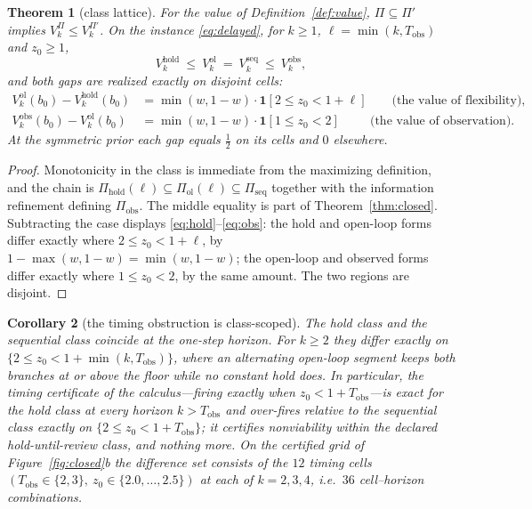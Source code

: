 \documentclass[11pt,a4paper]{article}
\theoremstyle{plain}
\newtheorem{theorem}{Theorem}[section]
\newtheorem{corollary}[theorem]{Corollary}
\theoremstyle{definition}
\theoremstyle{remark}
\newcommand{\hold}{\mathrm{hold}}
\newcommand{\ol}{\mathrm{ol}}
\newcommand{\seq}{\mathrm{seq}}
\newcommand{\obs}{\mathrm{obs}}
\newcommand{\Tobs}{T_{\mathrm{obs}}}
\newcommand{\ind}[1]{\mathbf{1}[#1]}
\newcommand{\tfr}[2]{\tfrac{#1}{#2}}
\begin{document}
\begin{theorem}[class lattice]\label{thm:lattice}
For the value of Definition~\ref{def:value}, $\Pi\subseteq\Pi'$ implies $V^{\Pi}_k\le V^{\Pi'}_k$. On the instance \eqref{eq:delayed}, for $k\ge1$, $\ell=\min(k,\Tobs)$ and $z_0\ge1$,
\[
V^{\hold}_k\ \le\ V^{\ol}_k\ =\ V^{\seq}_k\ \le\ V^{\obs}_k ,
\]
and both gaps are realized exactly on disjoint cells:
\begin{align}
V^{\ol}_k(b_0)-V^{\hold}_k(b_0)&=\min(w,1-w)\cdot\ind{2\le z_0<1+\ell}\qquad\text{(the value of flexibility)},\label{eq:flex}\\
V^{\obs}_k(b_0)-V^{\ol}_k(b_0)&=\min(w,1-w)\cdot\ind{1\le z_0<2}\qquad\ \ \text{(the value of observation)}.\label{eq:voi2}
\end{align}
At the symmetric prior each gap equals $\tfr12$ on its cells and $0$ elsewhere.
\end{theorem}

\begin{proof}
Monotonicity in the class is immediate from the maximizing definition, and the chain is $\Pi_{\hold}(\ell)\subseteq\Pi_{\ol}(\ell)\subseteq\Pi_{\seq}$ together with the information refinement defining $\Pi_{\obs}$. The middle equality is part of Theorem~\ref{thm:closed}. Subtracting the case displays \eqref{eq:hold}--\eqref{eq:obs}: the hold and open-loop forms differ exactly where $2\le z_0<1+\ell$, by $1-\max(w,1-w)=\min(w,1-w)$; the open-loop and observed forms differ exactly where $1\le z_0<2$, by the same amount. The two regions are disjoint.
\end{proof}

\begin{corollary}[the timing obstruction is class-scoped]\label{cor:timing}
The hold class and the sequential class coincide at the one-step horizon. For $k\ge2$ they differ exactly on $\{2\le z_0<1+\min(k,\Tobs)\}$, where an alternating open-loop segment keeps both branches at or above the floor while no constant hold does. In particular, the timing certificate of the calculus---firing exactly when $z_0<1+\Tobs$---is exact for the hold class at every horizon $k>\Tobs$ and over-fires relative to the sequential class exactly on $\{2\le z_0<1+\Tobs\}$; it certifies nonviability \emph{within the declared hold-until-review class}, and nothing more. On the certified grid of Figure~\ref{fig:closed}b the difference set consists of the $12$ timing cells $(\Tobs\in\{2,3\},\ z_0\in\{2.0,\dots,2.5\})$ at each of $k=2,3,4$, i.e.\ $36$ cell--horizon combinations.
\end{corollary}
\end{document}
